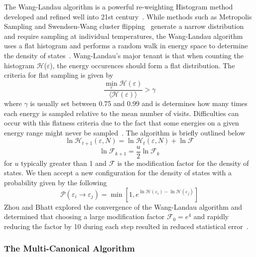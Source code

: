 \documentclass[letterpaper,twocolumn,amsmath,amssymb,pre,aps,10pt]{revtex4-1}
\begin{document}
The Wang-Landau algorithm is a powerful re-weighting Histogram method developed and refined well into 21st century~\cite{wang2001determining}.  While methods such as Metropolis Sampling and Swendsen-Wang cluster flipping~\cite{swendsen1987nonuniversal} generate a narrow distribution and require sampling at individual temperatures, the Wang-Landau algorithm uses a flat histogram and performs a random walk in energy space to determine the density of states~\cite{LandauMinSampling}.  Wang-Landau's major tenant is that when counting the histogram $\mathcal{H}$($\varepsilon$), the energy occurences should form a flat distribution.  The criteria for flat sampling is given by
\begin{equation}
	\frac{\min_{\varepsilon} \mathcal{H}(\varepsilon)}
	{\big\langle\mathcal{H}(\varepsilon)\big\rangle } 
	> \gamma 
\end{equation}
where $\gamma$ is usually set between 0.75 and 0.99 and is determines how many
times each energy is sampled relative to the mean number of visits.  Difficulties
can occur with this flatness criteria due to the fact that some energies on a
given energy range might never be sampled~\cite{haber2014transition}.  The algorithm
is briefly outlined below  
\begin{equation}
	\ln{\mathcal{H}_{t+1}(\varepsilon,N)}=\ln{\mathcal{H}_{t}(\varepsilon,N)}
	+\ln{\mathcal{F}}
\end{equation}
\begin{equation}
	\ln{\mathcal{F}_{k+1}}=\frac{u}{2}\ln{\mathcal{F}_{k}}
\end{equation}
for $u$ typically greater than 1 and $\mathcal{F}$ is the modification factor for
the density of states.  We then accept a new configuration for the density of 
states with a probability given by the following
\begin{equation}
	\mathcal{P}(\varepsilon_i \rightarrow \varepsilon_j) 
	= \min[1,e^{\ln{\mathcal{H}(\varepsilon_i)}-\ln{\mathcal{H}(\varepsilon_j)}}]
\end{equation}
Zhou and Bhatt explored the convergence of the Wang-Landau algorithm and 
determined that choosing a large modification factor $\mathcal{F}_0 = e^{4}$ and
rapidly reducing the factor by 10 during each step resulted in reduced statistical 
error~\cite{zhou2005understanding}.

\subsubsection{The Multi-Canonical Algorithm}
\end{document}
